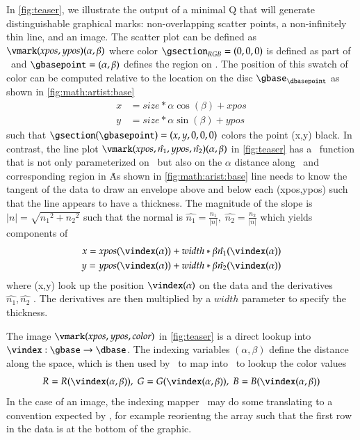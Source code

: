 \documentclass[journal]{vgtc}                %
\begin{document}
In \autoref{fig:teaser}, we illustrate the output of a minimal Q that will generate distinguishable graphical marks: non-overlapping scatter points, a non-infinitely thin line, and an image. The scatter plot can be defined as $\vmark(xpos, ypos)(\alpha, \beta)$ where color $\gsection_{RGB} = (0,0,0)$ is defined as part of \vmark\ and $\gbasepoint=(\alpha, \beta)$ defines the region on \gbase. The position of this swatch of color can be computed relative to the location on the disc $\gbase_{\dbasepoint}$ as shown in \autoref{fig:math:artist:base}
\begin{align*}
x &= size *\alpha \cos(\beta) + xpos \\
y &= size *\alpha \sin(\beta) + ypos
\end{align*}
such that $\gsection(\gbasepoint) = (x, y, 0, 0, 0)$ colors the point (x,y) black. In contrast, the line plot $\vmark(xpos, \hat{n_{1}}, ypos, \hat{n_{2}})(\alpha, \beta)$ in \autoref{fig:teaser} has a \vindex\ function that is not only parameterized on \dbasepoint\ but also on the $\alpha$ distance along \dbasepoint\ and corresponding region in \gbase\. As shown in \ref{fig:math:arist:base} line needs to know the tangent of the data to draw an envelope above and below each (xpos,ypos) such that the line appears to have a thickness. The magnitude of the slope is $\lvert n \rvert = \sqrt{{n_{1}}^2 + {n_{2}}^2}$
such that the normal is  $\hat{n_{1}} = \frac{n_1}{\lvert n \rvert}, \; \hat{n_{2}} = \frac{n_2}{\lvert n \rvert}$ which yields components of \gsection\
\begin{align*}
 x = xpos(\vindex(\alpha)) &+ width*\beta\hat{n_1}(\vindex(\alpha)) \\
 y = ypos(\vindex(\alpha)) &+ width*\beta\hat{n_2}(\vindex(\alpha)) 
\end{align*}
where (x,y) look up the position $\vindex(\alpha)$ on the data and the derivatives $\hat{n_1}, \hat{n_2}$ . The derivatives are then multiplied by a $width$ parameter to specify the thickness.

The image $\vmark(xpos, ypos, color)$ in \autoref{fig:teaser} is a direct lookup into  $\vindex:\gbase\rightarrow\dbase$. The indexing variables $(\alpha, \beta)$ define the distance along the space, which is then used by \vindex\ to map into \dbase\ to lookup the color values 
\begin{equation*}
R = R(\vindex(\alpha, \beta)), \; G = G(\vindex(\alpha, \beta)), \; B = B(\vindex(\alpha, \beta))
\end{equation*}
In the case of an image, the indexing mapper \vindex\ may do some translating to a convention expected by \vmark, for example reorientng the array such that the first row in the data is at the bottom of the graphic. 
\end{document}
